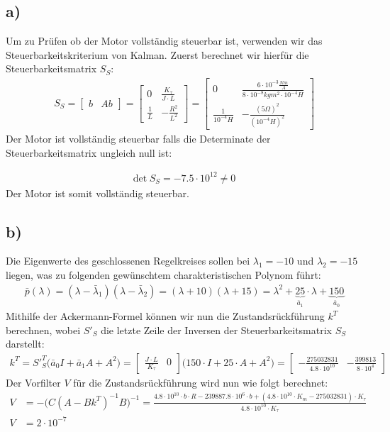 \documentclass[11pt]{scrartcl} %
\begin{document}
\subsection*{a)}
Um zu Prüfen ob der Motor vollständig steuerbar ist, verwenden wir das Steuerbarkeitskriterium von Kalman. Zuerst berechnet wir hierfür die Steuerbarkeitsmatrix $S_S$:
\begin{align*}
S_S=
\begin{bmatrix}
b &Ab
\end{bmatrix}
=
\begin{bmatrix}
0 & \frac{K_\tau}{J\cdot L}\\ \frac{1}{L} &-\frac{R^2}{L^2}
\end{bmatrix}
=
\begin{bmatrix}
0 & \frac{6\cdot 10^{-3}\frac{Nm}{A}}{8\cdot 10^{-8}kgm^2\cdot 10^{-4}H}\\ \frac{1}{10^{-4}H} &-\frac{(5\Omega)^2}{(10^{-4}H)^2}
\end{bmatrix}
\end{align*}
Der Motor ist vollständig steuerbar falls die Determinate der Steuerbarkeitsmatrix ungleich null ist:

\begin{align*}
\text{det} \hspace{3pt} S_S=-7.5\cdot 10^{12}\neq0
\end{align*}
Der Motor ist somit vollständig steuerbar.
\subsection*{b)}
Die Eigenwerte des geschlossenen Regelkreises sollen bei $\lambda_1=-10$ und $\lambda_2=-15$ liegen, was zu folgenden gewünschtem charakteristischen Polynom führt:
\begin{align*}
	\bar{p}(\lambda)=(\lambda-\bar{\lambda}_1)(\lambda-\bar{\lambda}_2)=(\lambda+10)(\lambda+15)=\lambda^2+\underbrace{25}_{\bar{a}_1}\cdot\lambda+\underbrace{150}_{\bar{a}_0}
\end{align*}
Mithilfe der Ackermann-Formel können wir nun die Zustandsrückführung $k^T$ berechnen, wobei ${S'}_S$ die letzte Zeile der Inversen der Steuerbarkeitsmatrix $S_S$ darstellt:
\begin{align*}
	k^T={S'}^T_S\bigl(\bar{a}_0I+\bar{a}_1A+A^2\bigr)=
	\begin{bmatrix}
		\frac{J\cdot L}{K_\tau} & 0
	\end{bmatrix}
	\bigl(150\cdot I+25\cdot A+A^2\bigr)=
	\begin{bmatrix}
		-\frac{275032831}{4.8\cdot 10^{10}}&-\frac{399813}{8\cdot 10^4}
	\end{bmatrix}
\end{align*}
Der Vorfilter $V$ für die Zustandsrückführung wird nun wie folgt berechnet:
\begin{align*}
	V&=-\bigl(C(A-Bk^T)^{-1}B\bigl)^{-1}=\frac{4.8\cdot 10^{10}\cdot b\cdot R-239887.8\cdot 10^6\cdot b+(4.8\cdot 10^{10}\cdot K_m-275032831)\cdot K_\tau}{4.8\cdot 10^{10}\cdot K_\tau}\\
	V&=2\cdot 10^{-7}
\end{align*}
\end{document}
